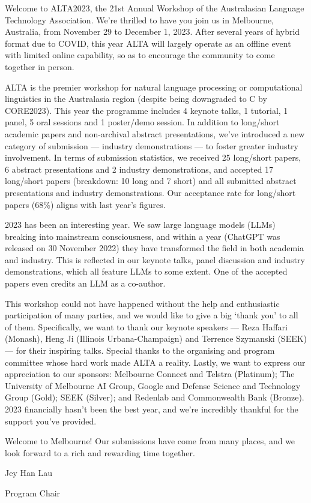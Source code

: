 Welcome to ALTA2023, the 21st Annual Workshop of the Australasian Language Technology Association. We're thrilled to have you join us in Melbourne, Australia, from November 29 to December 1, 2023. After several years of hybrid format due to COVID, this year ALTA will largely operate as an offline event with limited online capability, so as to encourage the community to come together in person.\newline

ALTA is the premier workshop for natural language processing or computational linguistics in the Australasia region (despite being downgraded to C by CORE2023). This year the programme includes 4 keynote talks, 1 tutorial, 1 panel, 5 oral sessions and 1 poster/demo session. In addition to long/short academic papers and non-archival abstract presentations, we've introduced a new category of submission --- industry demonstrations --- to foster greater industry involvement. In terms of submission statistics, we received 25 long/short papers, 6 abstract presentations and 2 industry demonstrations, and accepted 17 long/short papers (breakdown: 10 long and 7 short) and all submitted abstract presentations and industry demonstrations. Our acceptance rate for long/short papers (68\%) aligns with last year's figures.\newline

2023 has been an interesting year. We saw large language models (LLMs) breaking into mainstream consciousness, and within a year (ChatGPT was released on 30 November 2022) they have transformed the field in both academia and industry. This is reflected in our keynote talks, panel discussion and industry demonstrations, which all feature LLMs to some extent. One of the accepted papers even credits an LLM as a co-author.\newline

This workshop could not have happened without the help and enthusiastic participation of many parties, and we would like to give a big `thank you' to all of them. Specifically, we want to thank our keynote speakers --- Reza Haffari (Monash), Heng Ji (Illinois Urbana-Champaign) and Terrence Szymanski (SEEK) --- for their inspiring talks. Special thanks to the organising and program committee whose hard work made ALTA a reality. Lastly, we want to express our appreciation to our sponsors: Melbourne Connect and Telstra (Platinum); The University of Melbourne AI Group, Google and Defense Science and Technology Group (Gold); SEEK (Silver); and Redenlab and Commonwealth Bank (Bronze). 2023 financially hasn't been the best year, and we're incredibly thankful for the support you've provided.\newline

Welcome to Melbourne! Our submissions have come from many places, and we look forward to a rich and rewarding time together.\newline\newline\newline

Jey Han Lau\newline

Program Chair
